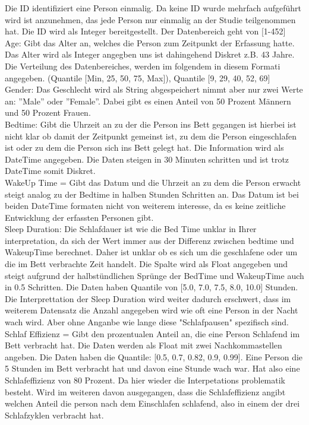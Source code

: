 \documentclass[usegeometry=true]{scrartcl}
\begin{document}
Die ID identifiziert eine Person einmalig. Da keine ID wurde mehrfach aufgeführt wird ist anzunehmen, das jede Person nur einmalig an der Studie teilgenommen hat. Die ID wird als Integer bereitgestellt. Der Datenbereich geht von [1-452]
\\ Age: Gibt das Alter an, welches die Person zum Zeitpunkt der Erfassung hatte. Das Alter wird als Integer angegben uns ist dahingehend Diskret z.B. 43 Jahre. Die Verteilung des Datenbereiches, werden im folgendem in diesem Formati angegeben. (Quantile [Min, 25, 50, 75, Max]), Quantile [9, 29, 40, 52, 69]
\\ Gender: Das Geschlecht wird als String abgespeichert nimmt aber nur zwei Werte an: ''Male'' oder ''Female''. Dabei gibt es einen  Anteil von 50 Prozent Männern und 50 Prozent Frauen. 
\\ Bedtime: Gibt die Uhrzeit an zu der die Person ins Bett gegangen ist hierbei ist nicht klar ob damit der Zeitpunkt gemeinst ist, zu dem die Person eingeschlafen ist oder zu dem die Person sich ins Bett gelegt hat.
 Die Information wird als DateTime angegeben. Die Daten steigen in 30 Minuten schritten und ist trotz DateTime somit Diskret. 
\\ WakeUp Time = Gibt das Datum und die Uhrzeit an zu dem die Person erwacht steigt analog zu der Bedtime in halben Stunden Schritten an. Das Datum ist bei beiden DateTime formaten nicht von weiterem interesse, da es keine zeitliche Entwicklung der erfassten Personen gibt. 
\\ Sleep Duration: Die Schlafdauer ist wie die Bed Time unklar in Ihrer interpretation, da sich der Wert immer aus der Differenz zwischen bedtime und WakeupTime berechnet. Daher ist unklar ob es sich um die geschlafene oder um die im Bett verbrachte Zeit handelt. Die Spalte wird als Float angegeben und steigt aufgrund der halbstündlichen Sprünge der BedTime und WakeupTime auch in 0.5 Schritten. Die Daten haben Quantile von [5.0, 7.0, 7.5, 8.0, 10.0] Stunden.
Die Interprettation der Sleep Duration wird weiter dadurch erschwert, dass im weiterem Datensatz die Anzahl angegeben wird wie oft eine Person in der Nacht wach wird. Aber ohne Anganbe wie lange diese "Schlafpausen" spezifisch sind. 
\\ Schlaf Effizienz = Gibt den prozentualen Anteil an, die eine Person Schlafend im Bett verbracht hat. Die Daten werden als Float mit zwei Nachkommastellen angeben. Die Daten haben die Quantile: [0.5, 0.7, 0.82, 0.9, 0.99]. Eine Person die 5 Stunden im Bett verbracht hat und davon eine Stunde wach war. Hat also eine Schlafeffizienz von 80 Prozent. Da hier wieder die Interpetations problematik besteht. Wird im weiteren davon ausgegangen, dass die Schlafeffizienz angibt welchen Anteil die person nach dem Einschlafen schlafend, also in einem der drei Schlafzyklen verbracht hat.
\end{document}
